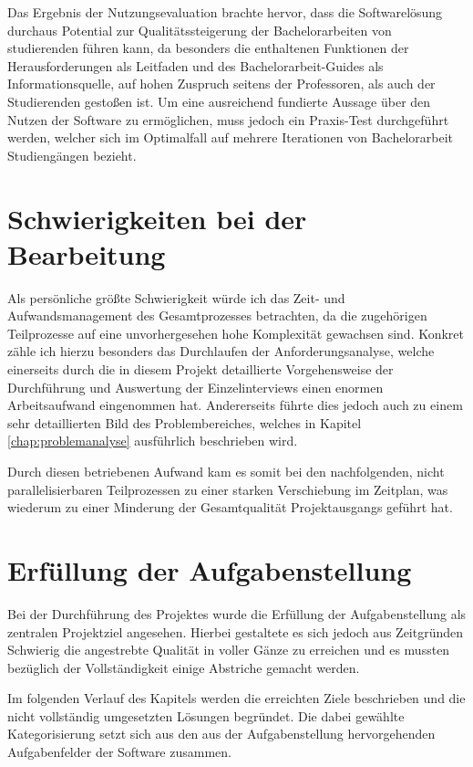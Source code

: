 \documentclass[bibliography=totoc,listof=totoc,BCOR=5mm,DIV=12,oneside]{scrbook}
\begin{document}
\par \bigskip Das Ergebnis der Nutzungsevaluation brachte hervor, dass die Softwarelösung durchaus Potential zur Qualitätssteigerung der Bachelorarbeiten von studierenden führen kann, da besonders die enthaltenen Funktionen der Herausforderungen als Leitfaden und des Bachelorarbeit-Guides als Informationsquelle, auf hohen Zuspruch seitens der Professoren, als auch der Studierenden gestoßen ist. Um eine ausreichend fundierte Aussage über den Nutzen der Software zu ermöglichen, muss jedoch ein Praxis-Test durchgeführt werden, welcher sich im Optimalfall auf mehrere Iterationen von Bachelorarbeit Studiengängen bezieht.

\section{Schwierigkeiten bei der Bearbeitung}
\par Als persönliche größte Schwierigkeit würde ich das Zeit- und Aufwandsmanagement des Gesamtprozesses betrachten, da die zugehörigen Teilprozesse auf eine unvorhergesehen hohe Komplexität gewachsen sind. Konkret zähle ich hierzu besonders das Durchlaufen der Anforderungsanalyse, welche einerseits durch die in diesem Projekt detaillierte Vorgehensweise der Durchführung und Auswertung der Einzelinterviews einen enormen Arbeitsaufwand eingenommen hat. Andererseits führte dies jedoch auch zu einem sehr detaillierten Bild des Problembereiches, welches in Kapitel \ref{chap:problemanalyse} ausführlich beschrieben wird. 
\par Durch diesen betriebenen Aufwand kam es somit bei den nachfolgenden, nicht parallelisierbaren Teilprozessen zu einer starken Verschiebung im Zeitplan, was wiederum zu einer Minderung der Gesamtqualität Projektausgangs geführt hat.

\section{Erfüllung der Aufgabenstellung}
\par Bei der Durchführung des Projektes wurde die Erfüllung der Aufgabenstellung als zentralen Projektziel angesehen. Hierbei gestaltete es sich jedoch aus Zeitgründen Schwierig die angestrebte Qualität in voller Gänze zu erreichen und es mussten bezüglich der Vollständigkeit einige Abstriche gemacht werden.
\par \bigskip Im folgenden Verlauf des Kapitels werden die erreichten Ziele beschrieben und die nicht vollständig umgesetzten Lösungen begründet. Die dabei gewählte Kategorisierung setzt sich aus den aus der Aufgabenstellung hervorgehenden Aufgabenfelder der Software zusammen.
\end{document}
